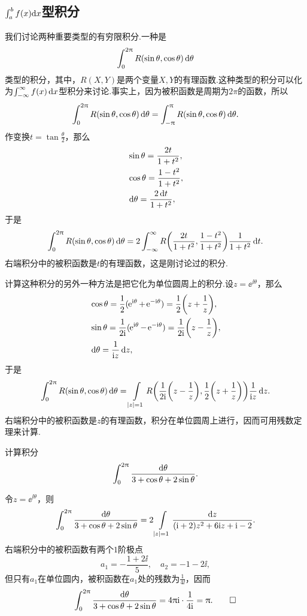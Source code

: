 \subsection{\mbox{$\int_a^b f(x){\normalfont\mathop{}\!\mathrm{d} }x$}型积分}
我们讨论两种重要类型的有穷限积分.一种是
\[
  \int_0^{2\uppi}R(\sin\theta,\cos\theta)\mathop{}\!\mathrm{d} \theta
\]
类型的积分，其中，$R(X,Y)$是两个变量$X,Y$的有理函数.这种类型的积分可以化为$\int_{-\infty}^\infty f(x)\mathop{}\!\mathrm dx$型积分来讨论.事实上，因为被积函数是周期为$2\pi$的函数，所以
\[
  \int_0^{2\uppi}R(\sin\theta,\cos\theta)\mathop{}\!\mathrm{d} \theta = \int_{-\uppi}^{\uppi}R(\sin\theta,\cos\theta)\mathop{}\!\mathrm{d} \theta.
\]
作变换$t=\tan\frac\theta2$，那么
\begin{align*}
  & \sin\theta = \frac{2t}{1+t^2},\\
  & \cos\theta = \frac{1-t^2}{1+t^2},\\
  & \mathop{}\!\mathrm{d} \theta = \frac{2\mathop{}\!\mathrm{d} t}{1+t^2},
\end{align*}
于是
\[
  \int_0^{2\uppi}R(\sin\theta,\cos\theta)\mathop{}\!\mathrm{d} \theta
  = 2\int_{-\infty}^\infty R\bigg(\frac{2t}{1+t^2},\frac{1-t^2}{1+t^2}\bigg)
  \frac1{1+t^2}\mathop{}\!\mathrm{d} t.
\]
右端积分中的被积函数是$t$的有理函数，这是刚讨论过的积分.

计算这种积分的另外一种方法是把它化为单位圆周上的积分.设$z=\ee^{\ii\theta}$，那么
\begin{align*}
  & \cos\theta = \frac12(\ee^{\ii\theta}+\ee^{-\ii\theta}) = \frac12\bigg(z+\frac1z\bigg),\\
  & \sin\theta = \frac1{2\ii}(\ee^{\ii\theta}-\ee^{-\ii\theta}) = \frac1{2\ii}\bigg(z-\frac1z\bigg),\\
  & \dif \theta = \frac{1}{\ii z}\dz,
\end{align*}
于是
\[
  \int_0^{2\uppi}R(\sin\theta,\cos\theta)\mathop{}\!\mathrm{d} \theta=
  \int\limits_{|z|=1}R\bigg(\frac1{2\mathrm i}\bigg(z-\frac1z\bigg),
  \frac12\bigg(z+\frac1z\bigg)\bigg)\frac1{\mathrm i z}\mathop{}\!\mathrm dz.
\]
右端积分中的被积函数是$z$的有理函数，积分在单位圆周上进行，因而可用残数定理来计算.

\begin{example}\label{exam5.5.13}
  计算积分
  \[
    \int_0^{2\uppi}\frac{\mathop{}\!\mathrm{d} \theta}{3+\cos\theta+2\sin\theta}.
  \]
\end{example}
\begin{solution}
  令$z=\ee^{\ii\theta}$，则
  \[
    \int_0^{2\uppi}\frac{\mathop{}\!\mathrm{d} \theta}{3+\cos\theta+2\sin\theta}
    =2\int\limits_{|z|=1}\frac{\mathop{}\!\mathrm dz}{(\mathrm i+2)z^2+6\mathrm i z+\mathrm i-2}.
  \]
  右端积分中的被积函数有两个$1$阶极点
  \[
    a_1 = -\frac{1+2\ii}5, \quad a_2 = -1-2\ii,
  \]
  但只有$a_1$在单位圆内，被积函数在$a_1$处的残数为$\frac1{4\ii}$，因而
  \begin{equation*}
    \int_0^{2\uppi}\frac{\mathop{}\!\mathrm{d} \theta}{3+\cos\theta+2\sin\theta}
    = 4\uppi\mathrm i\cdot\frac1{4\mathrm i} = \uppi. \qedhere
  \end{equation*}
\end{solution}

